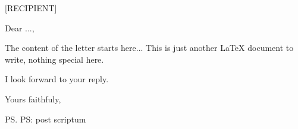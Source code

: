 \documentclass[a4paper
	,11pt
	]{letter}
\begin{document}
\pagestyle{plain}
\begin{letter}{%
	[RECIPIENT]
}

\opening{Dear ...,}

The content of the letter starts here...
This is just another \LaTeX{} document to write, nothing special here.

I look forward to your reply.

\closing{Yours faithfuly,}
\ps{PS: post scriptum}

\end{letter}
\end{document}
